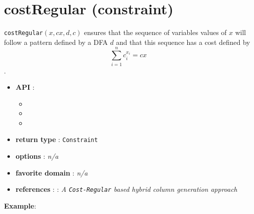 \section{costRegular (constraint)}\label{costregular:costregularconstraint}\hypertarget{costregular:costregularconstraint}{}
\begin{notedef}
  \texttt{costRegular}$(x, cx, d, c)$ ensures that the sequence of variables values of $x$ will follow a pattern defined by a DFA $d$ and that this sequence has a cost defined by $$\sum_{i=1}^{n} c_{i}^{x_i}=cx$$.
\end{notedef}

\begin{itemize}
	\item \textbf{API} :
	\begin{itemize}
		\item {}
		\item {}
		\item {}
	\end{itemize}
	\item \textbf{return type} : \texttt{Constraint}
	\item \textbf{options} : \emph{n/a}
	\item \textbf{favorite domain} : \emph{n/a}
	\item \textbf{references} : \cite{DemasseyC06}: \emph{A \texttt{Cost-Regular} based hybrid column generation approach}
\end{itemize}



\textbf{Example}:

